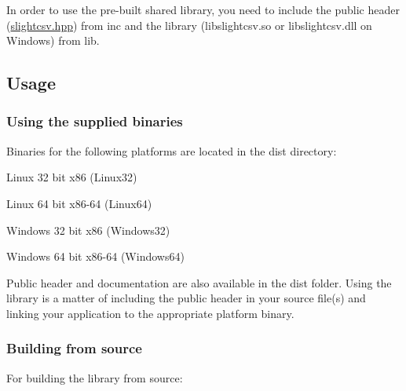 In order to use the pre-\/built shared library, you need to include the public header (\hyperlink{slightcsv_8hpp_source}{slightcsv.\+hpp}) from inc and the library (libslightcsv.\+so or libslightcsv.\+dll on Windows) from lib.

\subsection*{Usage}

\subsubsection*{Using the supplied binaries}

Binaries for the following platforms are located in the dist directory\+:


\begin{DoxyItemize}
\item Linux 32 bit x86 (Linux32)
\item Linux 64 bit x86-\/64 (Linux64)
\item Windows 32 bit x86 (Windows32)
\item Windows 64 bit x86-\/64 (Windows64)
\end{DoxyItemize}

Public header and documentation are also available in the dist folder. Using the library is a matter of including the public header in your source file(s) and linking your application to the appropriate platform binary.

\subsubsection*{Building from source}

For building the library from source\+:


